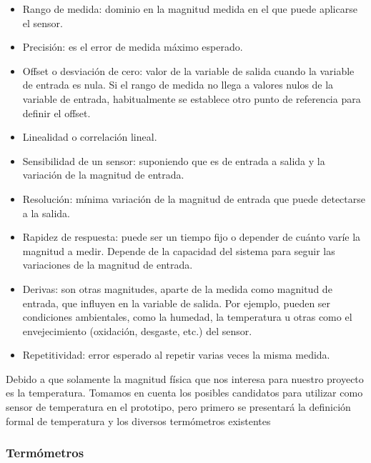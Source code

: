 \begin{itemize}
	
	\item Rango de medida: dominio en la magnitud medida en el que puede aplicarse el sensor.
	
	\item Precisión: es el error de medida máximo esperado.
	
	\item Offset o desviación de cero:  valor de la variable de salida cuando la variable de entrada es nula. Si el rango de medida no llega a valores nulos de la variable de entrada, habitualmente se establece otro punto de referencia para definir el offset.
	
	\item Linealidad o correlación lineal.
	
	\item Sensibilidad de un sensor: suponiendo que es de entrada a salida y la variación de la magnitud de entrada.
	
	\item Resolución: mínima variación de la magnitud de entrada que puede detectarse a la salida.
	
	\item Rapidez de respuesta: puede ser un tiempo fijo o depender de cuánto varíe la magnitud a medir. Depende de la capacidad del sistema para seguir las variaciones de la magnitud de entrada.
	
	\item Derivas: son otras magnitudes, aparte de la medida como magnitud de entrada, que influyen en la variable de salida. Por ejemplo, pueden ser condiciones ambientales, como la humedad, la temperatura u otras como el envejecimiento (oxidación, desgaste, etc.) del sensor.
	
	\item Repetitividad: error esperado al repetir varias veces la misma medida.
	
\end{itemize}

\par \noindent
Debido a que solamente la magnitud física que nos interesa para nuestro proyecto es la temperatura. Tomamos en cuenta los posibles candidatos para utilizar como sensor de temperatura en el prototipo, pero primero se presentará la definición formal de temperatura y los diversos termómetros existentes

\subsubsection{Termómetros}

